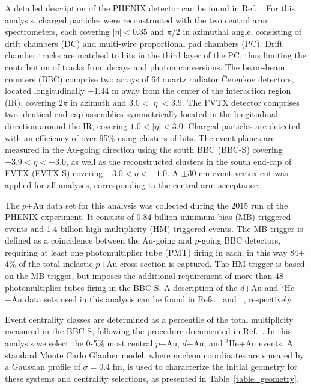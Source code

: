 \documentclass[%
reprint,
showpacs,preprintnumbers,
 amsmath,amssymb,
 aps,
]{revtex4-1}
\newcommand{\dau}{\mbox{$d$+Au}\xspace}
\newcommand{\pau}{\mbox{$p$+Au}\xspace}
\newcommand{\hau}{\mbox{$^3\text{He}$+Au}\xspace}
\newcommand{\bbceta}{\mbox{$3.0<|\eta|<3.9$}\xspace}
\begin{document}
A detailed description of the PHENIX detector can be found in Ref.~\cite{Adcox2003469}. For this analysis, charged particles were reconstructed with the two central arm spectrometers, each covering $|\eta|<0.35$ and $\pi/2$ in azimuthal angle, consisting of drift chambers (DC) and multi-wire proportional pad chambers (PC). Drift chamber tracks are matched to hits in the third layer of the PC, thus limiting the contribution of tracks from decays and photon conversions. The beam-beam counters (BBC) comprise two arrays of 64 quartz radiator \v{C}erenkov detectors, located longitudinally $\pm$1.44 m away from the center of the interaction region (IR), covering $2\pi$ in azimuth and \bbceta. The FVTX detector comprises two identical end-cap assemblies symmetrically located in the longitudinal direction around the IR, covering $1.0 < |\eta| < 3.0$. Charged particles are detected with an efficiency of over 95\% using clusters of hits. The event planes are measured in the Au-going direction using the south BBC (BBC-S) covering $−3.9 < \eta < −3.0$, as well as the reconstructed clusters in the south end-cap of FVTX (FVTX-S) covering $−3.0 < \eta < −1.0$. A $\pm$30 cm event vertex cut was applied for all analyses, corresponding to the central arm acceptance. 

The \pau data set for this analysis was collected during the 2015 run of the PHENIX experiment. It consists of 0.84 billion minimum bias (MB) triggered events and 1.4 billion high-multiplicity (HM) triggered events. The MB trigger is defined as a coincidence between the Au-going and $p$-going BBC detectors, requiring at least one photomultiplier tube (PMT) firing in each; in this way 84$\pm$4\% of the total inelastic \pau cross section is captured. The HM trigger is based on the MB trigger, but imposes the additional requirement of more than 48 photomultiplier tubes firing in the BBC-S. A description of the \dau and \hau data sets used in this analysis can be found in Refs.~\cite{adare_measurement_2014} and ~\cite{PhysRevLett.115.142301}, respectively.

Event centrality classes are determined as a percentile of the total multiplicity measured in the BBC-S, following the  procedure documented in Ref.~\cite{bbc}. In this analysis we select the 0-5\% most central \pau, \dau, and \hau events. A standard Monte Carlo Glauber model, where nucleon coordinates are smeared by a Gaussian profile of $\sigma = 0.4$ fm, is used to characterize the initial geometry for these systems and centrality selections, as presented in Table~\ref{table_geometry}.
\end{document}
